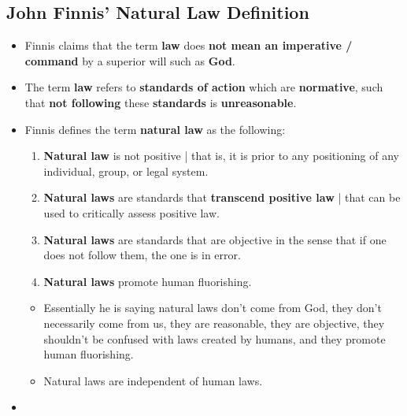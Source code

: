 \documentclass[16pt]{article}
\begin{document}
    \subsection*{John Finnis' Natural Law Definition}
    \begin{itemize}
        \item Finnis claims that the term \textbf{law} does \textbf{not mean an imperative / command} by a superior will such as \textbf{God}.
        \item The term \textbf{law} refers to \textbf{standards of action} which are \textbf{normative}, such that \textbf{not following} these \textbf{standards} is \textbf{unreasonable}.
        \item Finnis defines the term \textbf{natural law} as the following:
        \begin{enumerate}
            \item \textbf{Natural law} is not positive | that is, it is prior to any positioning of any individual, group, or legal system.
            \item \textbf{Natural laws} are standards that \textbf{transcend positive law} | that can be used to critically assess positive law.
            \item \textbf{Natural laws} are standards that are objective in the sense that if one does not follow them, the one is in error.
            \item \textbf{Natural laws} promote human fluorishing.
        \end{enumerate}
        \begin{itemize}
            \item Essentially he is saying natural laws don't come from God, they don't necessarily come from us, they are reasonable, they are objective, they shouldn't be confused with laws created by humans, and they promote human fluorishing.
            \item Natural laws are independent of human laws.
        \end{itemize}
        \item 
    \end{itemize}
\end{document}
